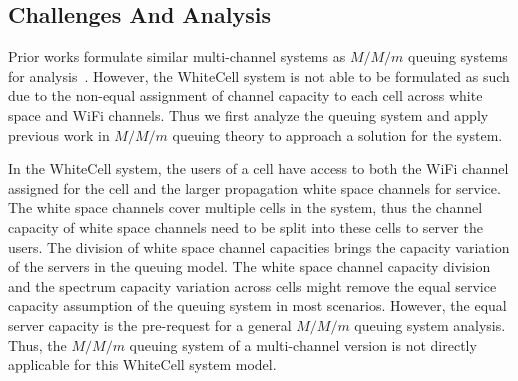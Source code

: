 \subsection{Challenges And Analysis}
\label{subsec:challenge}
Prior works formulate similar multi-channel systems as $M/M/m$ queuing systems for 
analysis~\cite{bodas2012low}. However, the WhiteCell system is not 
able to be formulated as such due to the non-equal assignment of channel capacity 
to each cell across white space and WiFi channels.
Thus we first analyze the queuing system and apply previous work in $M/M/m$ queuing 
theory to approach a solution for the system.

In the WhiteCell system, the users of a cell have access to both the WiFi 
channel assigned for the cell and the larger propagation white space channels for service. 
The white space channels cover multiple cells in the system, thus the channel capacity of white space channels need to be split into these cells 
to server the users.
The division of white space channel capacities brings the capacity variation of the servers 
in the queuing model.
The white space channel capacity division and the spectrum capacity variation across cells 
might remove the equal service capacity assumption of the queuing system in most scenarios.
However, the equal server capacity is the pre-request for a general $M/M/m$ queuing system 
analysis. Thus, the $M/M/m$ queuing system of a multi-channel version is not directly applicable 
for this WhiteCell system model.

